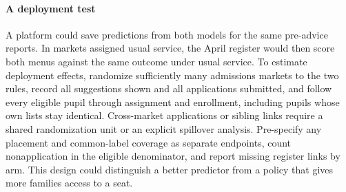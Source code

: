 

\paragraph{A deployment test}
A platform could save predictions from both models for the same pre-advice reports. In markets assigned usual service, the April register would then score both menus against the same outcome under usual service. To estimate deployment effects, randomize sufficiently many admissions markets to the two rules, record all suggestions shown and all applications submitted, and follow every eligible pupil through assignment and enrollment, including pupils whose own lists stay identical. Cross-market applications or sibling links require a shared randomization unit or an explicit spillover analysis. Pre-specify any placement and common-label coverage as separate endpoints, count nonapplication in the eligible denominator, and report missing register links by arm. This design could distinguish a better predictor from a policy that gives more families access to a seat.
